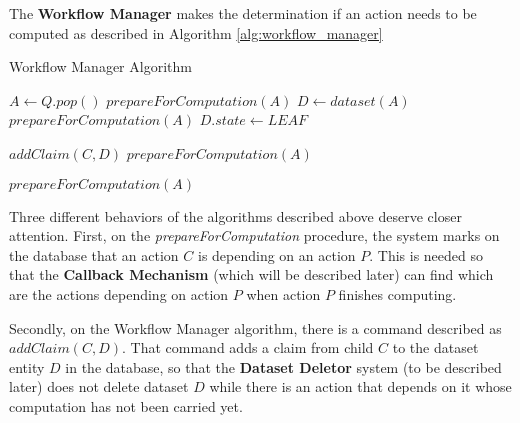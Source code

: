 The \textbf{Workflow Manager} makes the determination if an action needs to be computed as described in Algorithm \ref{alg:workflow_manager}

\begin{algorithm}
\begin{singlespace}
\caption{Workflow Manager Algorithm}
\label{alg:workflow_manager}
\begin{algorithmic}[1]
\State $A \gets Q.pop()$ 
	\State $prepareForComputation(A)$
\Else
	\State $D \gets dataset(A)$ 
		\State $prepareForComputation(A)$
	\Else
				\State $D.state \gets LEAF$
				
			\EndIf
			
					\State $addClaim(C, D)$ 
						\State $prepareForComputation(A)$
					\EndIf
				\EndIf
			
			\EndFor
		\Else
				\State $prepareForComputation(A)$
			\EndIf
		\EndIf
	\EndIf
\EndIf
\EndProcedure
\end{algorithmic}
\end{singlespace}
\end{algorithm}

Three different behaviors of the algorithms described above deserve closer attention. First, on the \textit{prepareForComputation} procedure, the system marks on the database that an action $C$ is depending on an action $P$. This is needed so that the \textbf{Callback Mechanism} (which will be described later) can find which are the actions depending on action $P$ when action $P$ finishes computing.

Secondly, on the Workflow Manager algorithm, there is a command described as $addClaim(C, D)$. That command adds a claim from child $C$ to the dataset entity $D$ in the database, so that the \textbf{Dataset Deletor} system (to be described later) does not delete dataset $D$ while there is an action that depends on it whose computation has not been carried yet.

